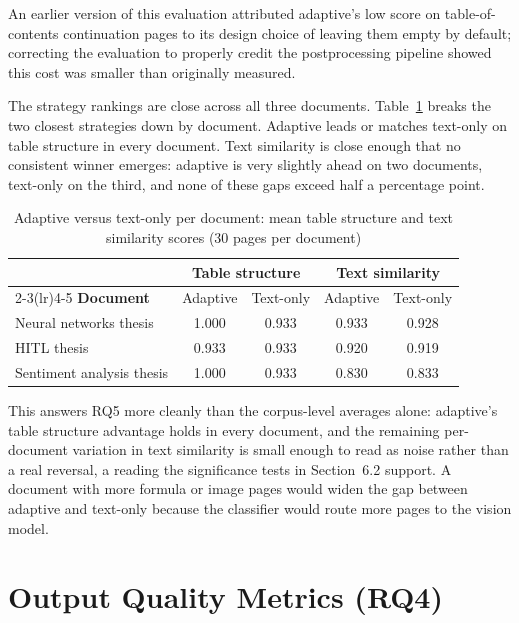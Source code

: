An earlier version of this evaluation attributed adaptive's low score on
table-of-contents continuation pages to its design choice of leaving them
empty by default; correcting the evaluation to properly credit the
postprocessing pipeline showed this cost was smaller than originally
measured.

The strategy rankings are close across all three documents.
Table~\ref{tab:per_document} breaks the two closest strategies down by
document. Adaptive leads or matches text-only on table structure in every
document. Text similarity is close enough that no consistent winner
emerges: adaptive is very slightly ahead on two documents, text-only on
the third, and none of these gaps exceed half a percentage point.

\begin{table}[ht]
\centering
\caption{Adaptive versus text-only per document: mean table structure and
text similarity scores (30 pages per document)}
\label{tab:per_document}
\renewcommand{\arraystretch}{1.3}
\begin{tabular}{lcccc}
\toprule
 & \multicolumn{2}{c}{\textbf{Table structure}} & \multicolumn{2}{c}{\textbf{Text similarity}} \\
\cmidrule(lr){2-3}\cmidrule(lr){4-5}
\textbf{Document} & Adaptive & Text-only & Adaptive & Text-only \\
\midrule
Neural networks thesis    & 1.000 & 0.933 & 0.933 & 0.928 \\
HITL thesis               & 0.933 & 0.933 & 0.920 & 0.919 \\
Sentiment analysis thesis & 1.000 & 0.933 & 0.830 & 0.833 \\
\bottomrule
\end{tabular}
\end{table}

This answers RQ5 more cleanly than the corpus-level averages alone: adaptive's
table structure advantage holds in every document, and the remaining
per-document variation in text similarity is small enough to read as noise
rather than a real reversal, a reading the significance tests in
Section~6.2 support. A document with more formula or image pages
would widen the gap between adaptive and text-only because the classifier
would route more pages to the vision model.

\section{Output Quality Metrics (RQ4)}
\label{sec:output_quality}

